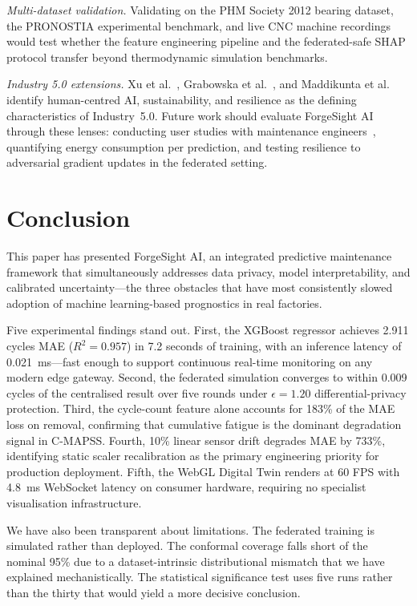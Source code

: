 \documentclass[10pt, journal, letterpaper]{IEEEtran}
\begin{document}
\textit{Multi-dataset validation.} Validating on the PHM Society 2012 bearing
dataset, the PRONOSTIA experimental benchmark, and live CNC machine recordings
would test whether the feature engineering pipeline and the federated-safe
SHAP protocol transfer beyond thermodynamic simulation benchmarks.

\textit{Industry 5.0 extensions.} Xu et al.~\cite{xu2021}, Grabowska et
al.~\cite{grabowska2022}, and Maddikunta et al.~\cite{maddikunta2022} identify
human-centred AI, sustainability, and resilience as the defining characteristics
of Industry~5.0. Future work should evaluate ForgeSight AI through these lenses:
conducting user studies with maintenance engineers~\cite{dosivelez2017},
quantifying energy consumption per prediction, and testing resilience to
adversarial gradient updates in the federated setting.

\section{Conclusion}
\label{sec:conclusion}

This paper has presented ForgeSight AI, an integrated predictive maintenance
framework that simultaneously addresses data privacy, model interpretability,
and calibrated uncertainty—the three obstacles that have most consistently
slowed adoption of machine learning-based prognostics in real factories.

Five experimental findings stand out. First, the XGBoost regressor achieves
2.911 cycles MAE ($R^2 = 0.957$) in 7.2 seconds of training, with an
inference latency of 0.021~ms—fast enough to support continuous real-time
monitoring on any modern edge gateway. Second, the federated simulation
converges to within 0.009 cycles of the centralised result over five rounds
under $\epsilon = 1.20$ differential-privacy protection. Third, the
cycle-count feature alone accounts for 183\% of the MAE loss on removal,
confirming that cumulative fatigue is the dominant degradation signal in
C-MAPSS. Fourth, 10\% linear sensor drift degrades MAE by 733\%,
identifying static scaler recalibration as the primary engineering priority
for production deployment. Fifth, the WebGL Digital Twin renders at 60 FPS
with 4.8~ms WebSocket latency on consumer hardware, requiring no specialist
visualisation infrastructure.

We have also been transparent about limitations. The federated training is
simulated rather than deployed. The conformal coverage falls short of the
nominal 95\% due to a dataset-intrinsic distributional mismatch that we have
explained mechanistically. The statistical significance test uses five runs
rather than the thirty that would yield a more decisive conclusion.
\end{document}
